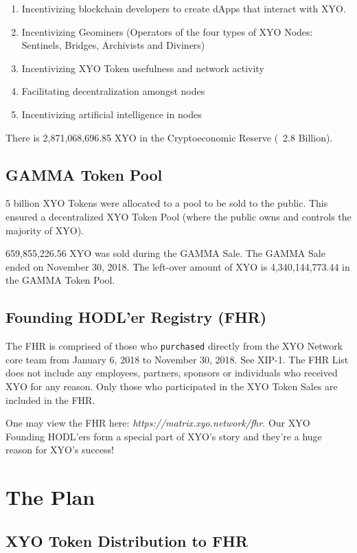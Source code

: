 \documentclass{article}
\begin{document}
\begin{enumerate}
  \item Incentivizing blockchain developers to create dApps that interact with XYO.
  \item Incentivizing Geominers (Operators of the four types of XYO Nodes: Sentinels, Bridges, Archivists and Diviners)
  \item Incentivizing XYO Token usefulness and network activity
  \item Facilitating decentralization amongst nodes
  \item Incentivizing artificial intelligence in nodes
\end{enumerate}


There is 2,871,068,696.85 XYO in the Cryptoeconomic Reserve (~2.8 Billion).

\subsection{GAMMA Token Pool}

5 billion XYO Tokens were allocated to a pool to be sold to the public. This ensured a decentralized XYO Token Pool (where the public owns and controls the majority of XYO). 

659,855,226.56 XYO was sold during the GAMMA Sale. The GAMMA Sale ended on November 30, 2018. The left-over amount of XYO is 4,340,144,773.44 in the GAMMA Token Pool.

\subsection{Founding HODL'er Registry (FHR)}

The FHR is comprised of those who \texttt{purchased} directly from the XYO Network core team from January 6, 2018 to November 30, 2018. See XIP-1.\cite{xip-1} The FHR List does not include any employees, partners, sponsors or individuals who received XYO for any reason. Only those who participated in the XYO Token Sales are included in the FHR.

One may view the FHR here: \textit{https://matrix.xyo.network/fhr}. Our XYO Founding HODL'ers form a special part of XYO's story and they're a huge reason for XYO's success!

\section{The Plan}

\subsection{XYO Token Distribution to FHR}
\end{document}
